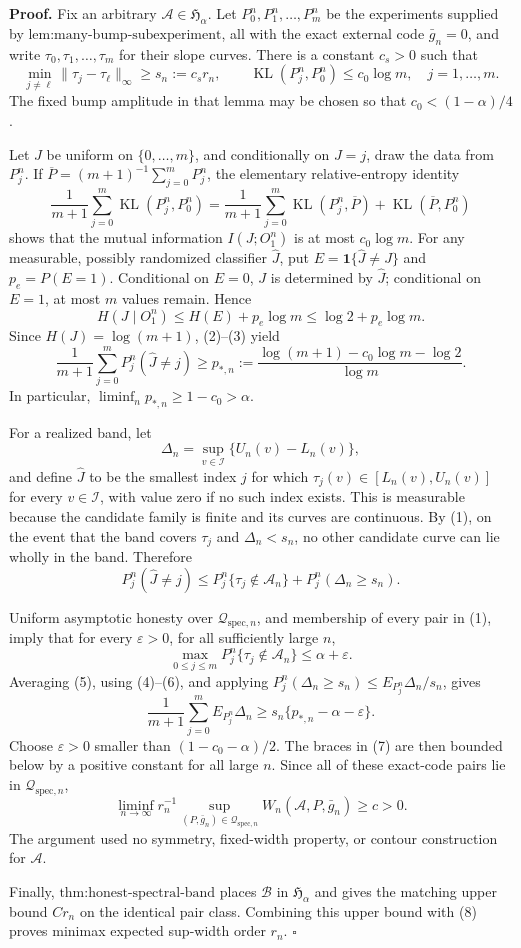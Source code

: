 \textbf{Proof.}
Fix an arbitrary \(\mathcal A\in\mathfrak H_\alpha\). Let \(P_0^n,P_1^n,\ldots,P_m^n\) be the experiments supplied by \(\text{lem:many-bump-subexperiment}\), all with the exact external code \(\bar g_n=0\), and write \(\tau_0,\tau_1,\ldots,\tau_m\) for their slope curves. There is a constant \(c_s>0\) such that
\[
 \min_{j\ne\ell}\|\tau_j-\tau_\ell\|_\infty
 \ge s_n:=c_sr_n, \qquad
 \operatorname{KL}(P_j^n,P_0^n)\le c_0\log m,
 \quad j=1,\ldots,m. \tag{1}
\]
The fixed bump amplitude in that lemma may be chosen so that \(c_0<(1-\alpha)/4\).

Let \(J\) be uniform on \(\{0,\ldots,m\}\), and conditionally on \(J=j\), draw the data from \(P_j^n\). If \(\overline P=(m+1)^{-1}\sum_{j=0}^mP_j^n\), the elementary relative-entropy identity
\[
 \frac1{m+1}\sum_{j=0}^m\operatorname{KL}(P_j^n,P_0^n)
 =\frac1{m+1}\sum_{j=0}^m\operatorname{KL}(P_j^n,\overline P)
 +\operatorname{KL}(\overline P,P_0^n) \tag{2}
\]
shows that the mutual information \(I(J;O_1^n)\) is at most \(c_0\log m\). For any measurable, possibly randomized classifier \(\widehat J\), put \(E=\mathbf 1\{\widehat J\ne J\}\) and \(p_e=P(E=1)\). Conditional on \(E=0\), \(J\) is determined by \(\widehat J\); conditional on \(E=1\), at most \(m\) values remain. Hence
\[
 H(J\mid O_1^n)
 \le H(E)+p_e\log m
 \le\log2+p_e\log m. \tag{3}
\]
Since \(H(J)=\log(m+1)\), (2)--(3) yield
\[
 \frac1{m+1}\sum_{j=0}^mP_j^n(\widehat J\ne j)
 \ge p_{*,n}:=\frac{\log(m+1)-c_0\log m-\log2}{\log m}. \tag{4}
\]
In particular, \(\liminf_np_{*,n}\ge1-c_0>\alpha\).

For a realized band, let
\[
 \Delta_n=\sup_{v\in\mathcal I}\{U_n(v)-L_n(v)\},
\]
and define \(\widehat J\) to be the smallest index \(j\) for which \(\tau_j(v)\in[L_n(v),U_n(v)]\) for every \(v\in\mathcal I\), with value zero if no such index exists. This is measurable because the candidate family is finite and its curves are continuous. By (1), on the event that the band covers \(\tau_j\) and \(\Delta_n<s_n\), no other candidate curve can lie wholly in the band. Therefore
\[
 P_j^n(\widehat J\ne j)
 \le P_j^n\{\tau_j\notin\mathcal A_n\}
 +P_j^n(\Delta_n\ge s_n). \tag{5}
\]

Uniform asymptotic honesty over \(\mathcal Q_{\mathrm{spec},n}\), and membership of every pair in (1), imply that for every \(\varepsilon>0\), for all sufficiently large \(n\),
\[
 \max_{0\le j\le m}P_j^n\{\tau_j\notin\mathcal A_n\}
 \le\alpha+\varepsilon. \tag{6}
\]
Averaging (5), using (4)--(6), and applying \(P_j^n(\Delta_n\ge s_n)\le E_{P_j^n}\Delta_n/s_n\), gives
\[
 \frac1{m+1}\sum_{j=0}^mE_{P_j^n}\Delta_n
 \ge s_n\{p_{*,n}-\alpha-\varepsilon\}. \tag{7}
\]
Choose \(\varepsilon>0\) smaller than \((1-c_0-\alpha)/2\). The braces in (7) are then bounded below by a positive constant for all large \(n\). Since all of these exact-code pairs lie in \(\mathcal Q_{\mathrm{spec},n}\),
\[
 \liminf_{n\to\infty}r_n^{-1}
 \sup_{(P,\bar g_n)\in\mathcal Q_{\mathrm{spec},n}}
 W_n(\mathcal A,P,\bar g_n)\ge c>0. \tag{8}
\]
The argument used no symmetry, fixed-width property, or contour construction for \(\mathcal A\).

Finally, \(\text{thm:honest-spectral-band}\) places \(\mathcal B\) in \(\mathfrak H_\alpha\) and gives the matching upper bound \(Cr_n\) on the identical pair class. Combining this upper bound with (8) proves minimax expected sup-width order \(r_n\). \(\square\)